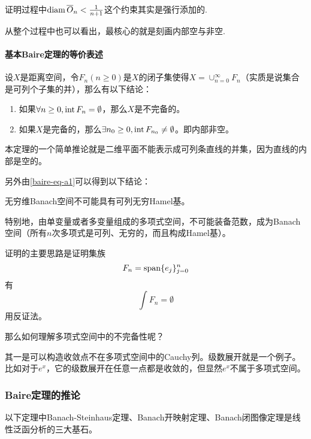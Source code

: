 证明过程中$\operatorname{diam} \overline{O}_n<\frac{1}{n+1}$这个约束其实是强行添加的.

从整个过程中也可以看出，最核心的就是刻画内部空与非空.
\paragraph*{基本Baire定理的等价表述}
\begin{theorem}[Baire定理的等价形式]\label{baire-eq}
设$X$是距离空间，令$F_n(n\geq 0)$是$X$的闭子集使得$X=\cup_{n=0}^\infty F_n$（实质是说集合是可列个子集的并），那么有以下结论：
\begin{enumerate}[label=(\alph*)]
\item\label{baire-eq-a1} 如果$\forall n\geq 0,\operatorname{int} F_n=\emptyset$，那么$X$是不完备的。
\item 如果$X$是完备的，那么$\exists n_0\geq 0,\operatorname{int} F_{n_0}\neq\emptyset$。即内部非空。
\end{enumerate}
\end{theorem}
本定理的一个简单推论就是二维平面不能表示成可列条直线的并集，因为直线的内部是空的。

另外由\ref{baire-eq-a1}可以得到以下结论：
\begin{theorem}[]
无穷维Banach空间不可能具有可列无穷Hamel基。

特别地，由单变量或者多变量组成的多项式空间，不可能装备范数，成为Banach空间（所有$n$次多项式是可列、无穷的，而且构成Hamel基）。
\end{theorem}
证明的主要思路是证明集族
$$F_n=\operatorname{span} \{e_j\}_{j=0}^n$$
有
$$\int F_n=\emptyset$$
用反证法。

那么如何理解多项式空间中的不完备性呢？

其一是可以构造收敛点不在多项式空间中的Cauchy列。级数展开就是一个例子。比如对于$e^x$，它的级数展开在任意一点都是收敛的，但显然$e^x$不属于多项式空间。

\subsubsection{Baire定理的推论}
以下定理中Banach-Steinhaus定理、Banach开映射定理、Banach闭图像定理是线性泛函分析的三大基石。

